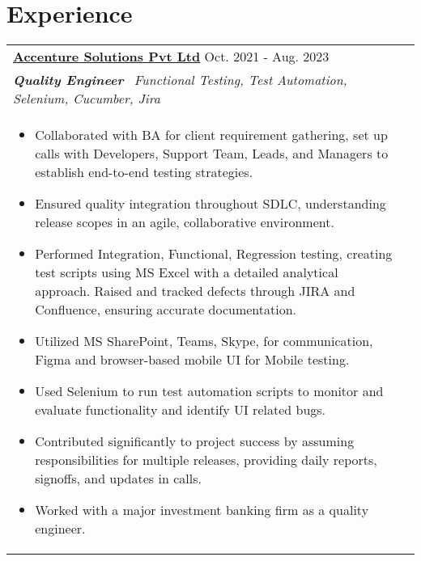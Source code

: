 \documentclass[a4paper,8pt]{article}
\begin{document}
\section{Experience}
\begin{tabularx}{\linewidth}{ @{}l r@{} }
\textbf{\uline{\href{https://www.accenture.com/}{Accenture Solutions Pvt Ltd}}} \hfill \color[HTML]{371e77} Oct. 2021 - Aug. 2023 \\[4pt]
\color[HTML]{371e77}\textbf{\textit{Quality Engineer}}\ \hfill \color[HTML]{4B28A4} \textit{Functional Testing, Test Automation, Selenium, Cucumber, Jira} \\[4pt]
\begin{minipage}[t]{\linewidth}
    \begin{itemize}[nosep,after=\strut, leftmargin=2em, itemsep=2pt]
        \item Collaborated with BA for client requirement gathering, set up calls with Developers, Support Team, Leads, and Managers to establish end-to-end testing strategies.
        \item Ensured quality integration throughout SDLC, understanding release scopes in an agile, collaborative environment.
        \item Performed Integration, Functional, Regression testing, creating test scripts using MS Excel with a detailed analytical approach. Raised and tracked defects through JIRA and Confluence, ensuring accurate documentation.
        \item Utilized MS SharePoint, Teams, Skype, for communication, Figma and browser-based mobile UI for Mobile testing.
        \item Used Selenium to run test automation scripts to monitor and evaluate functionality and identify UI related bugs. 
        \item Contributed significantly to project success by assuming responsibilities for multiple releases, providing daily reports, signoffs, and updates in calls.
        \item Worked with a major investment banking firm as a quality engineer.
    \end{itemize}
\end{minipage}
\end{tabularx}
\end{document}
